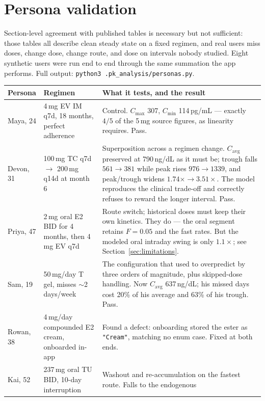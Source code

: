 \documentclass[11pt,a4paper]{article}
\newcommand{\bad}[1]{\textcolor{warn}{#1}}
\newcommand{\good}[1]{\textcolor{ok}{#1}}
\newcommand{\code}[1]{\texttt{\small #1}}
\begin{document}
\section{Persona validation}

Section-level agreement with published tables is necessary but not sufficient:
those tables all describe clean steady state on a fixed regimen, and real users
miss doses, change dose, change route, and dose on intervals nobody studied.
Eight synthetic users were run end to end through the same summation the app
performs. Full output: \code{python3 .pk\_analysis/personas.py}.

\begin{longtable}{@{}p{2.6cm}p{4.5cm}p{7.4cm}@{}}
\toprule
\textbf{Persona} & \textbf{Regimen} & \textbf{What it tests, and the result} \\
\midrule
\endhead
Maya, 24 & 4\,mg EV IM q7d, 18 months, perfect adherence
 & Control. $C_{\max}$ 307, $C_{\min}$ 114\,pg/mL --- exactly $4/5$ of the 5\,mg
   source figures, as linearity requires. \good{Pass.} \\[0.4em]
Devon, 31 & 100\,mg TC q7d $\to$ 200\,mg q14d at month 6
 & Superposition across a regimen change. $C_{\mathrm{avg}}$ preserved at
   790\,ng/dL as it must be; trough falls $561 \to 381$ while peak rises
   $976 \to 1339$, and peak/trough widens $1.74\times \to 3.51\times$. The model
   reproduces the clinical trade-off and correctly refuses to reward the longer
   interval. \good{Pass.} \\[0.4em]
Priya, 47 & 2\,mg oral E2 BID for 4 months, then 4\,mg EV q7d
 & Route switch; historical doses must keep their own kinetics. They do --- the
   oral segment retains $F = 0.05$ and the fast rates. \bad{But} the modeled oral
   intraday swing is only $1.1\times$; see Section~\ref{sec:limitations}. \\[0.4em]
Sam, 19 & 50\,mg/day T gel, misses $\sim$2 days/week
 & The configuration that used to overpredict by three orders of magnitude, plus
   skipped-dose handling. Now $C_{\mathrm{avg}}$ 637\,ng/dL; his missed days cost
   20\% of his average and 63\% of his trough. \good{Pass.} \\[0.4em]
Rowan, 38 & 4\,mg/day compounded E2 cream, onboarded in-app
 & Found a defect: onboarding stored the ester as \code{"Cream"}, matching no
   enum case. \good{Fixed at both ends.} \\[0.4em]
Kai, 52 & 237\,mg oral TU BID, 10-day interruption
 & Washout and re-accumulation on the fastest route. Falls to the endogenous

\end{longtable}
\end{document}
